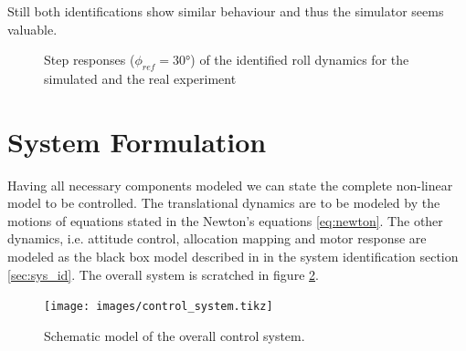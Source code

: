Still both identifications show similar behaviour and thus the simulator seems valuable.
\begin{figure} 
\centering 
 
\caption{Step responses ($\phi_{ref} = 30 \si{\degree}$) of the identified roll dynamics for the simulated and the real experiment} 
\label{fig:sys_id_step_response} 
\end{figure}

\section{System Formulation}
Having all necessary components modeled we can state the complete non-linear model to be controlled. The translational dynamics are to be modeled by the motions of equations stated in the Newton's equations \ref{eq:newton}. The other dynamics, i.e. attitude control, allocation mapping and motor response are modeled as the black box model described in in the system identification section \ref{sec:sys_id}. The overall system is scratched in figure \ref{pics:control_system}.

\begin{figure}
\centering
\texttt{[image: images/control\_system.tikz]}
\caption{Schematic model of the overall control system.}
\label{pics:control_system}
\end{figure}

